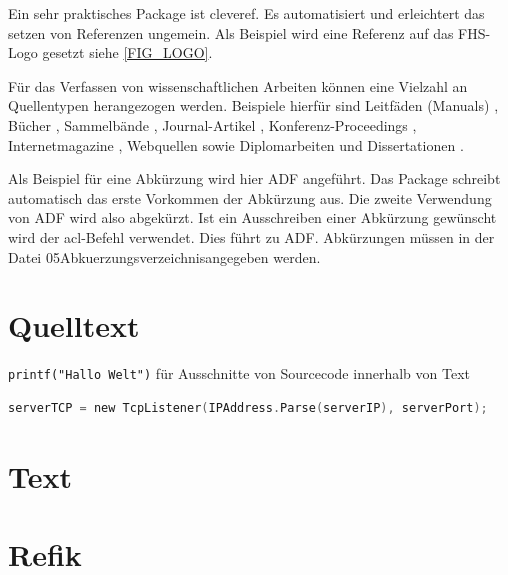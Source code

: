 Ein sehr praktisches Package ist cleveref. Es automatisiert und erleichtert das setzen von Referenzen ungemein. Als Beispiel wird eine Referenz auf das FHS-Logo gesetzt siehe \cref{FIG_LOGO}.

Für das Verfassen von wissenschaftlichen Arbeiten können eine Vielzahl an Quellentypen herangezogen werden. Beispiele hierfür sind Leitfäden (Manuals) \citep{RFC2828} \citep{80211i} \citep{80211} \cite{X800} \citep{TR102377} \citep{EN301893} \citep{PUB197} \citep{PUB74}, Bücher \citep{Fis04a} \citep{Rei05a} \citep{Tan00a} \citep{Ste04a} \citep{GMS00a} \citep{HL98a}, Sammelbände \citep{EHL00a} \citep{Sch94a}, Journal-Artikel \citep{TM03a} \citep{CP03a}, Konferenz-Proceedings \citep{HCB00a} \citep{KBW04a} \citep{KSW04a} \citep{HK05a}, Internetmagazine \citep{Eke05a}, Webquellen \cite{nist} \cite{php} \cite{BDKMT93a} \cite{IDSSM} sowie Diplomarbeiten und Dissertationen \citep{Sch98} \cite{Hae94a}.

Als Beispiel für eine Abkürzung wird hier \ac{ADF} angeführt. Das Package schreibt automatisch das erste Vorkommen der Abkürzung aus. Die zweite Verwendung von \ac{ADF} wird also abgekürzt. Ist ein Ausschreiben einer Abkürzung gewünscht wird der acl-Befehl verwendet. Dies führt zu \acl{ADF}. Abkürzungen müssen in der Datei \glqq 05Abkuerzungsverzeichnis\grqq angegeben werden.

\section{Quelltext}

\texttt{printf("Hallo Welt")} für Ausschnitte von Sourcecode innerhalb von Text

\begin{lstlisting}[language=C,
caption=Beispiel-Listing,
label=LST_SAMPLE]
serverTCP = new TcpListener(IPAddress.Parse(serverIP), serverPort);
\end{lstlisting}


\section{Text}

\section{Refik}

